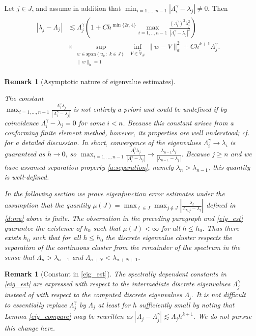 \documentclass{siamart0516}
\newtheorem{remark}[theorem]{Remark}
\numberwithin{equation}{section}
\numberwithin{theorem}{section}
\numberwithin{figure}{section}
\begin{document}
\begin{theorem}
Let $j \in J$, and assume in addition that $\min_{i=1,..., n-1} |\Lambda^\gamma_i-\lambda_j| \neq 0$.  Then
\begin{align}
\label{eig_est}
\begin{aligned}
|\lambda_j - \Lambda_{j}|    &\lesssim \Lambda^\gamma_j \left (1 + C h^{\min\{2r, 4\}} \max_{i=1,.., n-1} \frac{(\Lambda^\gamma_i)^2 \lambda_j^2}{|\Lambda^\gamma_{i}-\lambda_j|^2} \right) \\
&\times\sup_{\substack{w  \in \textrm{span}(u_k \ : \ k \in J)\\ \|w\|_{\tilde a}=1}} \inf_{V \in \widetilde{\mathbb V}_\#}\|w-V\|_{\tilde a}^2 + C h^{k+1} \Lambda^\gamma_j.
\end{aligned}
\end{align}
\end{theorem}
\begin{remark}[Asymptotic nature of eigenvalue estimates]\label{r:mu}
{\it The constant\\ 
	$\max_{i=1,..., n-1} \frac{\Lambda^\gamma_i \lambda_j}{|\Lambda^\gamma_i-\lambda_j|}$ is not entirely a priori and could be undefined if by coincidence $\Lambda^\gamma_{i}-\lambda_j=0$ for some $i<n$.  Because this constant arises from a conforming finite element method, however, its properties are well understood; cf. \cite[Section 3.2]{KO06} for a detailed discussion.  In short, convergence of the eigenvalues $\Lambda^\gamma_{i} \rightarrow \lambda_i$ is guaranteed as $h \rightarrow 0$, so $\max_{i=1,..., n-1} \frac{\Lambda^\gamma_{i} \lambda_j}{|\Lambda^\gamma_{i}-\lambda_j|} \rightarrow \frac{\lambda_{n-1} \lambda_j}{|\lambda_{n-1}-\lambda_j|}$.  Because $j \ge n$ and we have assumed separation property \eqref{a:separation}, namely  $\lambda_n> \lambda_{n-1}$, this quantity is well-defined.  

In the following section we prove eigenfunction error estimates under the assumption that the quantity $\mu(J)= \max_{\ell \in J} \max_{j \notin J} \left | \frac{\lambda_\ell}{\Lambda_{h,j}-\lambda_\ell} \right |$ defined in \eqref{d:mu} above is finite.  The observation in the preceding paragraph and \eqref{eig_est} guarantee the existence of $h_0$ such that $\mu(J)<\infty$ for all $h \le h_0$.  Thus there exists $h_0$ such that for all $h \le h_0$ the discrete eigenvalue cluster respects the separation of the continuous cluster from the remainder of the spectrum in the sense that $\Lambda_{n}>\lambda_{n-1}$ and $\Lambda_{n+N} < \lambda_{n+N+1}$.  
}
\end{remark}
\begin{remark}[Constant in \eqref{eig_est}]
{\it The spectrally dependent constants in \eqref{eig_est} are expressed with respect to the intermediate discrete eigenvalues $\Lambda^\gamma_{j}$ instead of with respect to the computed discrete eigenvalues $\Lambda_{j}$.  It is not difficult to essentially replace $\Lambda^\gamma_{j}$ by $\Lambda_{j}$ at least for $h$ sufficiently small by noting that Lemma \ref{eig_compare} may be rewritten as $|\Lambda_{j}-\Lambda^\gamma_{j}| \lesssim \Lambda_{j} h^{k+1}$.  We do not pursue this change here.}
\end{remark}
\end{document}
